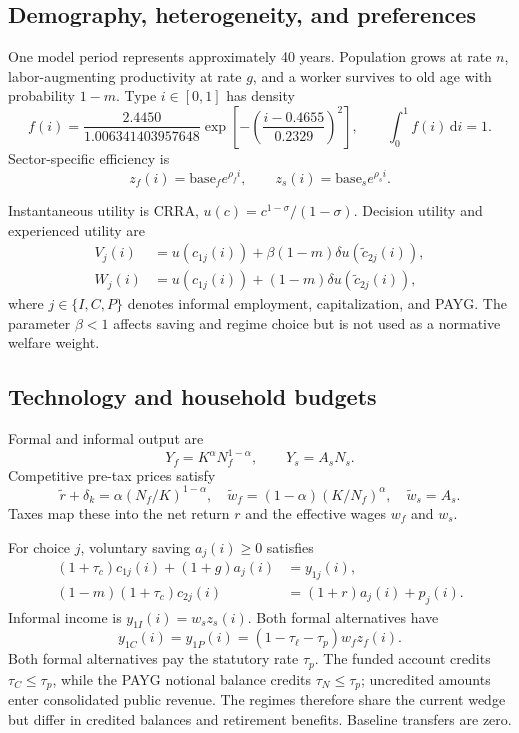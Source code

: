 \documentclass[12pt]{article}
\newcommand{\1}{\mathbf{1}}
\newcommand{\dd}{\,\mathrm{d}}
\begin{document}
\subsection{Demography, heterogeneity, and preferences}

One model period represents approximately 40 years. Population grows at rate $n$,
labor-augmenting productivity at rate $g$, and a worker survives to old age with probability
$1-m$. Type $i\in[0,1]$ has density
\begin{equation}
f(i)=\frac{2.4450}{1.006341403957648}
\exp\left[-\left(\frac{i-0.4655}{0.2329}\right)^2\right],
\qquad \int_0^1 f(i)\dd i=1.
\end{equation}
Sector-specific efficiency is
\begin{equation}
z_f(i)=\mathrm{base}_f e^{\rho_f i},
\qquad
z_s(i)=\mathrm{base}_s e^{\rho_s i}.
\end{equation}

Instantaneous utility is CRRA, $u(c)=c^{1-\sigma}/(1-\sigma)$. Decision utility and
experienced utility are
\begin{align}
V_j(i)&=u(c_{1j}(i))+\beta(1-m)\delta u(\widetilde c_{2j}(i)),\\
W_j(i)&=u(c_{1j}(i))+(1-m)\delta u(\widetilde c_{2j}(i)),
\end{align}
where $j\in\{I,C,P\}$ denotes informal employment, capitalization, and PAYG.
The parameter $\beta<1$ affects saving and regime choice but is not used as a normative
welfare weight.

\subsection{Technology and household budgets}

Formal and informal output are
\begin{equation}
Y_f=K^\alpha N_f^{1-\alpha},
\qquad
Y_s=A_sN_s.
\end{equation}
Competitive pre-tax prices satisfy
\begin{equation}
\widetilde r+\delta_k=\alpha(N_f/K)^{1-\alpha},\quad
\widetilde w_f=(1-\alpha)(K/N_f)^\alpha,\quad
\widetilde w_s=A_s.
\end{equation}
Taxes map these into the net return $r$ and the effective wages $w_f$ and $w_s$.

For choice $j$, voluntary saving $a_j(i)\geq0$ satisfies
\begin{align}
(1+\tau_c)c_{1j}(i)+(1+g)a_j(i)&=y_{1j}(i),\\
(1-m)(1+\tau_c)c_{2j}(i)&=(1+r)a_j(i)+p_j(i).
\end{align}
Informal income is $y_{1I}(i)=w_sz_s(i)$. Both formal alternatives have
\begin{equation}
y_{1C}(i)=y_{1P}(i)
=\left(1-\tau_\ell-\tau_p\right)w_fz_f(i).
\end{equation}
Both formal alternatives pay the statutory rate $\tau_p$. The funded account credits
$\tau_C\leq\tau_p$, while the PAYG notional balance credits $\tau_N\leq\tau_p$; uncredited
amounts enter consolidated public revenue. The regimes therefore share the current wedge but
differ in credited balances and retirement benefits. Baseline transfers are zero.
\end{document}
